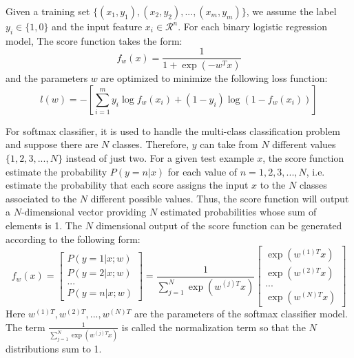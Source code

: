 Given a training set $\{(x_1,y_1),(x_2,y_2),...,(x_m,y_m)\}$, we assume the label $y_i \in \{1,0\}$ and the input feature $x_i \in \mathcal{R}^n$. For each binary logistic regression model, The score function takes the form:
\begin{equation}
	{f_w}(x) = \frac{1}{{1 + \exp ( - {w^T}x)}}
\end{equation}
and the parameters $w$ are optimized to minimize the following loss function:
\begin{equation}
	l(w) =  - [\sum\limits_{i = 1}^m {{y_i}\log {f_w}({x_i}) + (1 - {y_i})} \log (1 - {f_w}({x_i}))]\label{eq:logistic:loss}
\end{equation}

For softmax classifier, it is used to handle the multi-class classification problem and suppose there are $N$ classes. Therefore, $y$ can take from $N$ different values $\{1,2,3,...,N\}$ instead of just two. For a given test example $x$, the score function estimate the probability $P(y=n|x)$ for each value of $n = 1,2,3,...,N$, i.e. estimate the probability that each score assigns the input $x$ to the $N$ classes associated to the $N$ different possible values. Thus, the score function will output a $N$-dimensional vector providing $N$ estimated probabilities whose sum of elements is 1. The $N$ dimensional output of the score function can be generated according to the following form:
\begin{equation}
{f_w}\left( x \right) = \left[ \begin{array}{l}
P\left( {y = 1|x;w} \right)\\
P\left( {y = 2|x;w} \right)\\
...\\
P\left( {y = n|x;w} \right)
\end{array} \right] = \frac{1}{{\sum\nolimits_{j = 1}^N {\exp \left( {{w^{(j)T}}x} \right)} }}\left[ \begin{array}{l}
\exp \left( {{w^{(1)T}}x} \right)\\
\exp \left( {{w^{(2)T}}x} \right)\\
...\\
\exp \left( {{w^{(N)T}}x} \right)
\end{array} \right]
\end{equation}
Here $w^{(1)T},w^{({2})T},...,w^{({N})T}$ are the parameters of the softmax classifier model. The term $\frac{1}{{\sum\nolimits_{j = 1}^N {\exp \left( {{w^{(j)T}}x} \right)} }}$ is called the normalization term so that the $N$ distributions sum to 1.

